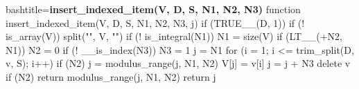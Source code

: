 \begin{NexCodeBox}{bash}{title=\textbf{insert_indexed_item(V, D, S, N1, N2, N3)}}
function insert_indexed_item(V, D, S, N1, N2, N3, j)
{
	if (TRUE__(D, 1)) {
		if (! is_array(V))
			split("", V, "")
		if (! is_integral(N1))
			N1 = size(V)
		if (LT__(+N2, N1))
			N2 = 0
		if (! __is_index(N3))
			N3 = 1
		j = N1
		for (i = 1; i <= trim_split(D, v, S); i++) {
			if (N2)
				j = modulus_range(j, N1, N2)
			V[j] = v[i]
			j = j + N3
		}
		delete v
		if (N2)
			return modulus_range(j, N1, N2)
		return j
	}
}
\end{NexCodeBox}

\begin{NexMainBox}
	\begin{NexMainBox}[dark, crnA, title=Validation and Initialization]
		\begin{NexListDark}
		\end{NexListDark}

	\end{NexMainBox}
\end{NexMainBox}




